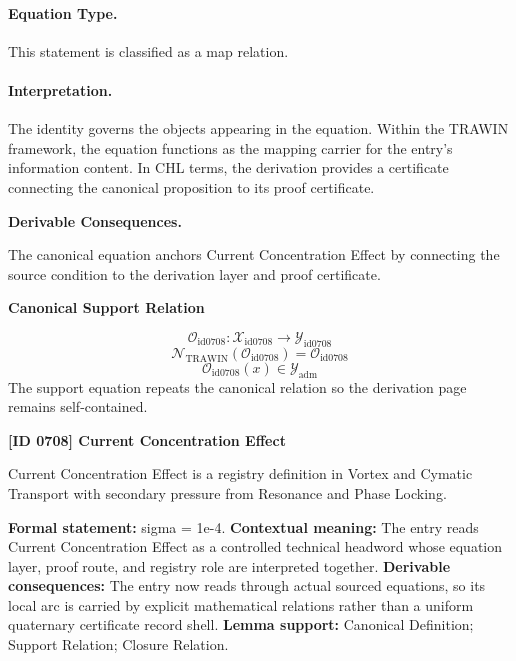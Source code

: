 \paragraph{Equation Type.}
This statement is classified as a map relation.

\paragraph{Interpretation.}
The identity governs the objects appearing in the equation. Within the TRAWIN framework, the equation functions as the mapping carrier for the entry’s information content. In CHL terms, the derivation provides a certificate connecting the canonical proposition to its proof certificate.

\par\vspace{0.35em}
\noindent\textbf{Derivable Consequences.}\quad
\begingroup
\footnotesize
\raggedright
The canonical equation anchors Current Concentration Effect by connecting the source condition to the derivation layer and proof certificate.
\par\endgroup

\noindent\textbf{Canonical Support Relation}\par
\[
\mathcal{O}_{\mathrm{id0708}}:\mathcal{X}_{\mathrm{id0708}}\longrightarrow\mathcal{Y}_{\mathrm{id0708}}
\]
\[
\mathcal{N}_{\mathrm{TRAWIN}}(\mathcal{O}_{\mathrm{id0708}})=\mathcal{O}_{\mathrm{id0708}}
\]
\[
\mathcal{O}_{\mathrm{id0708}}(x)\in\mathcal{Y}_{\mathrm{adm}}
\]
\noindent The support equation repeats the canonical relation so the derivation page remains self-contained.\par

\clearpage
\noindent\textbf{[ID 0708] Current Concentration Effect}\par
\vspace{0.35em}
\begingroup\small
{}
Current Concentration Effect is a registry definition in Vortex and Cymatic Transport with secondary pressure from Resonance and Phase Locking.

\begingroup\footnotesize\setlength{\emergencystretch}{3em}\sloppy
\textbf{Formal statement:} sigma = 1e-4. \textbf{Contextual meaning:} The entry reads Current Concentration Effect as a controlled technical headword whose equation layer, proof route, and registry role are interpreted together. \textbf{Derivable consequences:} The entry now reads through actual sourced equations, so its local arc is carried by explicit mathematical relations rather than a uniform quaternary certificate record shell. \textbf{Lemma support:} Canonical Definition; Support Relation; Closure Relation.\par
\endgroup

